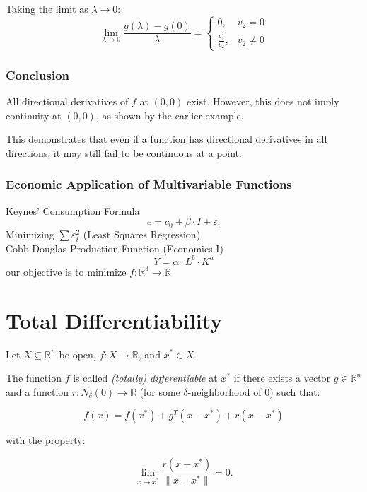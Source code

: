 \documentclass{article}
\begin{document}
Taking the limit as \( \lambda \to 0 \):
\[
\lim_{\lambda \to 0} \frac{g(\lambda) - g(0)}{\lambda} = 
\begin{cases} 
0, & v_2 = 0 \\ 
\frac{v_1^2}{v_2}, & v_2 \neq 0 
\end{cases}
\]

\subsubsection*{Conclusion}

All directional derivatives of \( f \) at \( (0, 0) \) exist. However, this does not imply continuity at \( (0, 0) \), as shown by the earlier example. 

This demonstrates that even if a function has directional derivatives in all directions, it may still fail to be continuous at a point.

\subsubsection*{Economic Application of Multivariable Functions}
Keynes' Consumption Formula
\begin{equation*} e = c_0 + \beta \cdot I + \varepsilon_i \end{equation*}
Minimizing $\sum \varepsilon_i^{2}$ (Least Squares Regression)\\[5mm]
Cobb-Douglas Production Function (Economics I)
\begin{equation*} Y = \alpha \cdot L^{b} \cdot K^{a} \end{equation*}
our objective is to minimize $f:\mathbb{R}^3 \rightarrow \mathbb{R}$ \newpage
\section{Total Differentiability}
Let \( X \subseteq \mathbb{R}^n \) be open, \( f: X \rightarrow \mathbb{R} \), and \( x^* \in X \).

The function \( f \) is called \textit{(totally) differentiable} at \( x^* \) if there exists a vector \( g \in \mathbb{R}^n \) and a function \( r: N_\delta(0) \rightarrow \mathbb{R} \) (for some \(\delta\)-neighborhood of \( 0 \)) such that:

\[
f(x) = f(x^*) + g^T(x - x^*) + r(x - x^*)
\]

with the property:

\[
\lim_{x \to x^*} \frac{r(x - x^*)}{\|x - x^*\|} = 0.
\]
\end{document}
